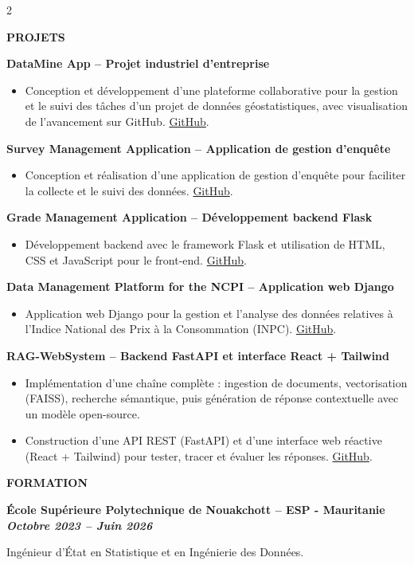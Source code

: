 \documentclass[10pt,a4paper,ragged2e,withhyper]{style} \geometry{left=1cm,right=1cm,top=0.4cm,bottom=0.4cm,columnsep=1.2cm} \usepackage{paracol} \usepackage{xcolor} \definecolor{MainGreen}{HTML}{1f2c67} \definecolor{SlateGrey}{HTML}{2E2E2E} \definecolor{LightGrey}{HTML}{666666}  \colorlet{heading}{MainGreen} \colorlet{headingrule}{MainGreen} \colorlet{accent}{MainGreen} \colorlet{emphasis}{SlateGrey} \colorlet{body}{LightGrey} \renewcommand{\cvItemMarker}{{\small\textbullet}} \renewcommand{\cvRatingMarker}{\faCircle} \renewcommand{\cvsectionfont}{\large\bfseries} \renewcommand{\cvsubsectionfont}{\normalsize\bfseries}  \renewcommand{\namefont}{\Huge\rmfamily\bfseries}
\renewcommand{\cvsection}[2][]{%
  \par\vspace{6pt}%
  \ifstrequal{#1}{}{}{\marginpar{\vspace*{\dimexpr1pt-\baselineskip}\raggedright}}%
  {\color{heading}\cvsectionfont \MakeUppercase{#2}}\par%
  \vspace{2pt}
  {\color{headingrule}\hdashrule{\linewidth}{0.5pt}{2pt}\par}\vspace{2pt}
}
\renewcommand{\cvevent}[4]{%
  \normalsize\par\noindent
  {\bfseries\color{emphasis}#1\ifstrequal{#2}{}{}{ -- #2}}%
  \ifstrequal{#3}{}{}{%
    \hfill{\color{accent}\bfseries\itshape\cvDateMarker~%
      \BeginAccSupp{method=pdfstringdef,ActualText={\datename: }}#3\EndAccSupp{}}%
  }\par
  \ifstrequal{#4}{}{}{%
    {\small\itshape\color{body}\cvLocationMarker~%
      \BeginAccSupp{method=pdfstringdef,ActualText={\locationname: }}#4\EndAccSupp{}\par}}%
  \vspace{2pt}%
  \footnotesize
}
\renewcommand{\divider}{\par\noindent\textcolor{body!30}{\hdashrule{\linewidth}{0.5pt}{0.4ex}}\vspace{2pt}}
\begin{document}
\begin{paracol}{2}
\cvsection{Projets}
\cvevent{DataMine App}{Projet industriel d'entreprise}{}{}
\begin{itemize}
  \item Conception et développement d'une plateforme collaborative pour la gestion et le suivi des tâches d'un projet de données géostatistiques, avec visualisation de l'avancement sur GitHub. \href{https://github.com/MoustaphaCheikhJidou/DataMineSynergy-App.git}{GitHub}.
\end{itemize}
\divider
\cvevent{Survey Management Application}{Application de gestion d'enquête}{}{}
\begin{itemize}
  \item Conception et réalisation d'une application de gestion d'enquête pour faciliter la collecte et le suivi des données. \href{https://github.com/MoustaphaCheikhJidou/survey-data-collection.git}{GitHub}.
\end{itemize}
\divider
\cvevent{Grade Management Application}{Développement backend Flask}{}{}
\begin{itemize}
  \item Développement backend avec le framework Flask et utilisation de HTML, CSS et JavaScript pour le front-end. \href{https://github.com/MoustaphaCheikhJidou/ISMSNotesApp.git}{GitHub}.
\end{itemize}
\divider
\cvevent{Data Management Platform for the NCPI}{Application web Django}{}{}
\begin{itemize}
  \item Application web Django pour la gestion et l'analyse des données relatives à l'Indice National des Prix à la Consommation (INPC). \href{https://github.com/MoustaphaCheikhJidou/INPC-Data-Management-and-Analysis-Platform}{GitHub}.
\end{itemize}
\divider
\cvevent{RAG-WebSystem}{Backend FastAPI et interface React + Tailwind}{}{}
\begin{itemize}
  \item Implémentation d'une chaîne complète : ingestion de documents, vectorisation (FAISS), recherche sémantique, puis génération de réponse contextuelle avec un modèle open-source.
  \item Construction d'une API REST (FastAPI) et d'une interface web réactive (React + Tailwind) pour tester, tracer et évaluer les réponses. \href{https://github.com/MoustaphaCheikhJidou/RAG-WebSystem}{GitHub}.
\end{itemize}

\switchcolumn \cvsection{Formation}
\cvevent{École Supérieure Polytechnique de Nouakchott}{ESP - Mauritanie}{Octobre 2023 -- Juin 2026}{} Ingénieur d'État en Statistique et en Ingénierie des Données.


\end{paracol}
\end{document}

